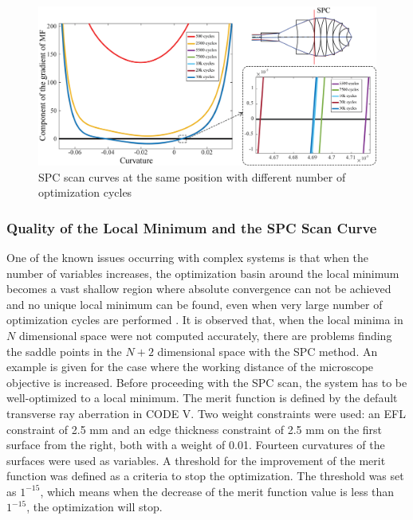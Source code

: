 \begin{figure}[h!]
    \centering
    \includegraphics[width=\textwidth]{chapter-4/figures/vollrath_optcyc.png}
    \caption{SPC scan curves at the same position with different number of optimization cycles}
    \label{fig: vollrath_optcyc}
\end{figure}

\subsubsection{Quality of the Local Minimum and the SPC Scan Curve}
One of the known issues occurring with complex systems is that when the number of variables increases, the optimization basin around the local minimum becomes a vast shallow region where absolute convergence can not be achieved and no unique local minimum can be found, even when very large number of optimization cycles are performed \cite{Brixner81}. It is observed that, when the local minima in $N$ dimensional space were not computed accurately, there are problems finding the saddle points in the $N+2$ dimensional space with the SPC method. An example is given for the case where the working distance of the microscope objective is increased. Before proceeding with the SPC scan, the system has to be well-optimized to a local minimum. The merit function is defined by the default transverse ray aberration in CODE V. Two weight constraints were used: an EFL constraint of 2.5 mm and an edge thickness constraint of 2.5 mm on the first surface from the right, both with a weight of 0.01. Fourteen curvatures of the surfaces were used as variables. A threshold for the improvement of the merit function was defined as a criteria to stop the optimization. The threshold was set as $1^{-15}$, which means when the decrease of the merit function value is less than $1^{-15}$, the optimization will stop. 
 
